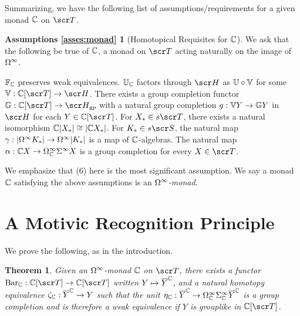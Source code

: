 \documentclass{amsart}
\newtheorem{thm}{Theorem}[section]
\theoremstyle{definition}
\newtheorem*{asses:monad}{Assumptions \ref{asses:monad}}
\begin{document}
Summarizing, we have the following list of assumptions/requirements for a given monad $\mathbb{C}$ on $\sT$. 

\begin{asses:monad}[Homotopical Requisites for $\mathbb{C}$]
We ask that the following be true of $\mathbb{C}$, a monad on $\sT$ acting naturally on the image of $\Omega^{\infty}$.
\begin{outline}[enumerate]
\1 $\mathbb{F}_{\mathbb{C}}$ preserves weak equivalences.
\1 $\mathbb{U}_{\mathbb{C}}$ factors through $\sH$ as $\mathbb{U} \circ \mathbb{V}$ for some $\bV : \bC[\sT] \to \sH$.
\1 There exists a group completion functor $\bG : \bC [\sT] \to \sH_{gp}$ with a natural group completion $g : \mathbb{V} Y \to \mathbb{G} Y$ in $\sH$ for each $Y \in \bC[\sT]$.
\1 For $X_{*} \in s\sT$, there exists a natural isomorphism $\mathbb{C} |X_{*}| \cong |\mathbb{C} X_{*}|$.
\1 For $K_{*} \in s\sS$, the natural map $\gamma : |\Omega^{\infty}K_{*}| \to \Omega^{\infty}|K_{*}|$ is a map of $\mathbb{C}$-algebras.
\1 The natural map $\alpha : \mathbb{C} X \to \Omega^{\infty}_{\mathbb{C}}\Sigma^{\infty}X$ is a group completion for every $X \in \sT$. 
\end{outline}
\end{asses:monad}

We emphasize that (6) here is the most significant assumption. We say a monad $\mathbb{C}$ satisfying the above assumptions is an \emph{$\Omega^{\infty}$-monad}.

\section{A Motivic Recognition Principle}\label{sec:Recprincreal}

We prove the following, as in the introduction. 

\begin{thm}
Given an $\Omega^{\infty}$-monad $\mathbb{C}$ on $\sT$, there exists a functor $\mathrm{Bar}_{\bC} : \bC[\sT] \to \bC[\sT]$ written $Y \mapsto \overline{Y}^{\mathbb{C}}$, and a natural homotopy equivalence $\zeta_{\mathbb{C}} : \overline{Y}^{\mathbb{C}} \to Y$ such that the unit $\eta_{\mathbb{C}}:\overline{Y}^{\mathbb{C}} \to \Omega^{\infty}_{\mathbb{C}}\Sigma^{\infty}_{\mathbb{C}} \overline{Y}^{\mathbb{C}}$ is a group completion and is therefore a weak equivalence if $Y$ is grouplike in $\bC[\sT]$.
\end{thm}
\end{document}
